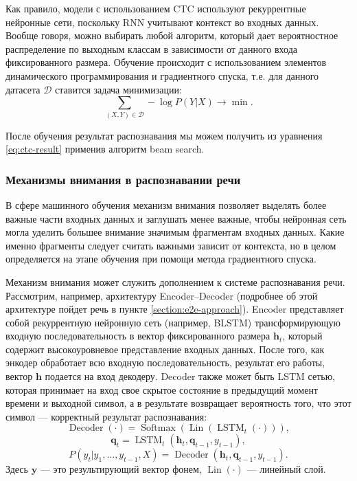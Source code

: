 Как правило, модели с использованием CTC используют рекуррентные нейронные сети, поскольку RNN учитывают контекст во входных данных. Вообще говоря, можно выбирать любой алгоритм, который дает вероятностное распределение по выходным классам в зависимости от данного входа фиксированного размера. Обучение происходит с использованием элементов динамического программирования и градиентного спуска, т.е. для данного датасета $\mathcal{D}$ ставится задача минимизации:
$$\sum_{(X, Y) \in \mathcal{D}} - \log P(Y | X) \rightarrow \min.$$

После обучения результат распознавания мы можем получить из уравнения \ref{eq:ctc-result} применив алгоритм beam search.

\subsubsection{Механизмы внимания в распознавании речи}
В сфере машинного обучения механизм внимания позволяет выделять более важные части входных данных и заглушать менее важные, чтобы нейронная сеть могла уделить большее внимание значимым фрагментам входных данных. Какие именно фрагменты следует считать важными зависит от контекста, но в целом определяется на этапе обучения при помощи метода градиентного спуска.

Механизм внимания может служить дополнением к системе распознавания речи. Рассмотрим, например, архитектуру Encoder--Decoder (подробнее об этой архитектуре пойдет речь в пункте \ref{section:e2e-approach}). Encoder представляет собой рекуррентную нейронную сеть (например, BLSTM) трансформирующую входную последовательность в вектор фиксированного размера $\mathbf{h}_t$, который содержит высокоуровневое представление входных данных. После того, как энкодер обработает всю входную последовательность, результат его работы, вектор $\mathbf{h}$ подается на вход декодеру. Decoder также может быть LSTM сетью, которая принимает на вход свое скрытое состояние в предыдущий момент времени и выходной символ, а в результате возвращает вероятность того, что этот символ --- корректный результат распознавания:
$$\operatorname{Decoder}(\cdot) = \operatorname{Softmax}(\operatorname{Lin}(\operatorname{LSTM}_t(\cdot))),$$
$$\mathbf{q}_t = \operatorname{LSTM}_t(\mathbf{h}_t, \mathbf{q}_{t - 1}, y_{t - 1}),$$
$$P(y_t|y_1, \dots, y_{t - 1}, X) = \operatorname{Decoder}(\mathbf{h}_t, \mathbf{q}_{t - 1}, y_{t - 1}).$$
Здесь $\mathbf{y}$ --- это результирующий вектор фонем, $\operatorname{Lin}(\cdot)$ --- линейный слой.

